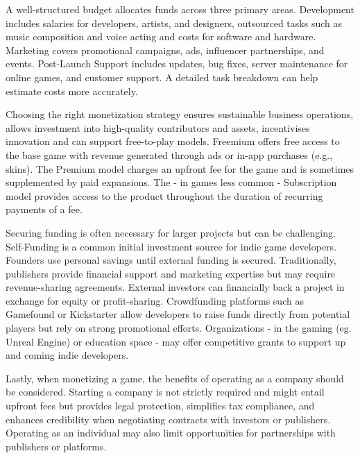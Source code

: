 A well-structured budget allocates funds across three primary areas. Development includes salaries for developers, artists, and designers, outsourced tasks such as music composition and voice acting and costs for software and hardware. Marketing covers promotional campaigns, ads, influencer partnerships, and events. Post-Launch Support includes updates, bug fixes, server maintenance for online games, and customer support. A detailed task breakdown can help estimate costs more accurately.

Choosing the right monetization strategy ensures sustainable business operations, allows investment into high-quality contributors and assets, incentivises innovation and can support free-to-play models. Freemium offers free access to the base game with revenue generated through ads or in-app purchases (e.g., skins). The Premium model charges an upfront fee for the game and is sometimes supplemented by paid expansions. The - in games less common - Subscription model provides access to the product throughout the duration of recurring payments of a fee. 

Securing funding is often necessary for larger projects but can be challenging. Self-Funding is a common initial investment source for indie game developers. Founders use personal savings until external funding is secured. Traditionally, publishers provide financial support and marketing expertise but may require revenue-sharing agreements. External investors can financially back a project in exchange for equity or profit-sharing. Crowdfunding platforms such as Gamefound or Kickstarter allow developers to raise funds directly from potential players but rely on strong promotional efforts. Organizations - in the gaming (eg. Unreal Engine) or education space - may offer competitive grants to support up and coming indie developers.

Lastly, when monetizing a game, the benefits of operating as a company should be considered. Starting a company is not strictly required and might entail upfront fees but provides legal protection, simplifies tax compliance, and enhances credibility when negotiating contracts with investors or publishers. Operating as an individual may also limit opportunities for partnerships with publishers or platforms.
